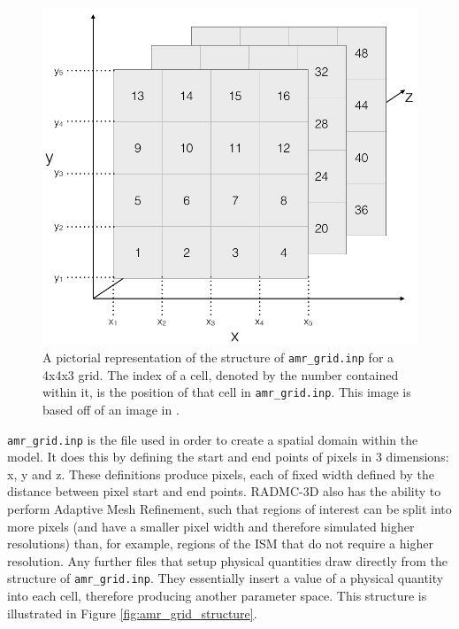 \documentclass{report}
\begin{document}
\begin{figure}
  \centering
  \includegraphics[scale=0.3]{../img/amr_grid_structure}
  \caption[A pictorial representation of the structure of \texttt{amr\_grid.inp} for a 4x4x3 grid. The index of a cell, denoted by the number contained within it, is the position of that cell in \texttt{amr\_grid.inp}. This image is based off of an image in \textcite{manual}.]{A pictorial representation of the structure of \texttt{amr\_grid.inp} for a 4x4x3 grid. The index of a cell, denoted by the number contained within it, is the position of that cell in \texttt{amr\_grid.inp}. This image is based off of an image in \textcite{manual}.}
\end{figure}\label{fig:amr_grid_structure}

\texttt{amr\_grid.inp} is the file used in order to create a spatial domain within the model. It does this by defining the start and end points of pixels in 3 dimensions: x, y and z. These definitions produce pixels, each of fixed width defined by the distance between pixel start and end points. RADMC-3D also has the ability to perform Adaptive Mesh Refinement, such that regions of interest can be split into more pixels (and have a smaller pixel width and therefore simulated higher resolutions) than, for example, regions of the ISM that do not require a higher resolution. Any further files that setup physical quantities draw directly from the structure of \texttt{amr\_grid.inp}. They essentially \textquotesingle insert \textquotesingle a value of a physical quantity into each cell, therefore producing another parameter space. This structure is illustrated in Figure \ref{fig:amr_grid_structure}.
\end{document}
